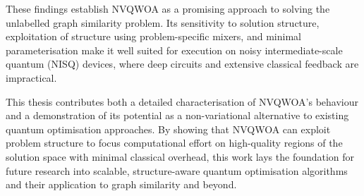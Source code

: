 These findings establish NVQWOA as a promising approach to solving the unlabelled graph similarity problem. Its sensitivity to solution structure, exploitation of structure using problem-specific mixers, and minimal parameterisation make it well suited for execution on noisy intermediate-scale quantum (NISQ) devices, where deep circuits and extensive classical feedback are impractical. 

This thesis contributes both a detailed characterisation of NVQWOA's behaviour and a demonstration of its potential as a non-variational alternative to existing quantum optimisation approaches. By showing that NVQWOA can exploit problem structure to focus computational effort on high-quality regions of the solution space with minimal classical overhead, this work lays the foundation for future research into scalable, structure-aware quantum optimisation algorithms and their application to graph similarity and beyond.